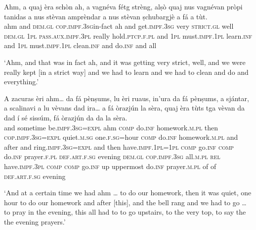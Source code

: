 \begin{linenumbers}
\gll    Ahm, a quaj èra schòn ah, a vagnéva fétg strèng, alṣò quaj nus vagnévan pròpi tanidas a nus stèvan amprèndar a nus stèvan ṣchubargjè a fá a tùt.\\
ahm and \textsc{dem.gl} \textsc{cop.impf.3sg}in-fact ah and get.\textsc{impf.3sg} very \textsc{strict.gl} well \textsc{dem.gl} \textsc{1pl} \textsc{pass.aux.impf.3pl} really hold.\textsc{ptcp.f.pl} and \textsc{1pl} must.\textsc{impf.1pl} learn.\textsc{inf} and \textsc{1pl}  must.\textsc{impf.1pl} clean.\textsc{inf} and do.\textsc{inf} and all\
\end{linenumbers}
\medskip
\glt `Ahm, and that was in fact ah, and it was getting very strict, well, and we were really kept [in a strict way] and we had to learn and we had to clean and do and everything.'
\medskip

\begin{linenumbers}
\gll    A zacuras èri ahm… da fá pènṣums, lu èri ruaus, in’ura da fá pènṣums, a sjántar, a scalinavi a lu vèvans dad ira… a fá òrazjún la sèra, quaj èra tùts tga vèvan da dad í sé sissúm, fá òrazjún da da la sèra.\\
and sometime be.\textsc{impf.3sg=expl} ahm \textsc{comp} do.\textsc{inf} homework.\textsc{m.pl} then \textsc{cop.impf.3sg=expl} quiet.\textsc{m.sg} one.\textsc{f.sg}=hour \textsc{comp} do.\textsc{inf} homework.\textsc{m.pl} and after and ring.\textsc{impf.3sg=expl} and then have.\textsc{impf.1pl=1pl} \textsc{comp} go.\textsc{inf} \textsc{comp} do.\textsc{inf} prayer.\textsc{f.pl} \textsc{def.art.f.sg} evening \textsc{dem.gl} \textsc{cop.impf.3sg} all.\textsc{m.pl} \textsc{rel} have.\textsc{impf.3pl} \textsc{comp} \textsc{comp} go.\textsc{inf} up uppermost do.\textsc{inf} prayer.\textsc{m.pl} of of \textsc{def.art.f.sg} evening \\
\end{linenumbers}
\medskip
\glt `And at a certain time we had ahm … to do our homework, then it was quiet, one hour to do our homework and after [this], and the bell rang and we had to go … to pray in the evening, this all had to to go upstairs, to the very top, to say the the evening prayers.'
\medskip


